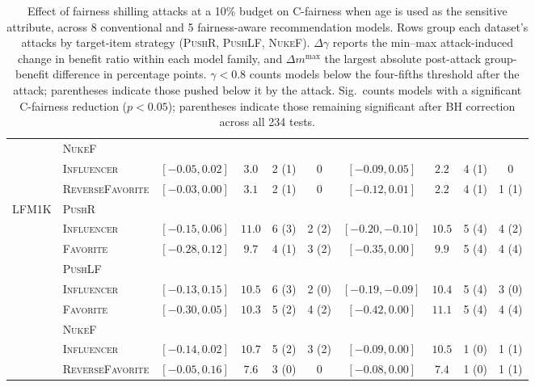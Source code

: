 \begin{table}
\begin{adjustbox}{max width=\textwidth}
\begin{tabular}{l l cccc cccc}
\cmidrule(lr){2-10}
 & \multicolumn{9}{l}{\textsc{NukeF}} \\
 & \quad \textsc{Influencer} & $[-0.05, 0.02]$ & $3.0$ & 2 (1) & 0 & $[-0.09, 0.05]$ & $2.2$ & 4 (1) & 0 \\
 & \quad \textsc{ReverseFavorite} & $[-0.03, 0.00]$ & $3.1$ & 2 (1) & 0 & $[-0.12, 0.01]$ & $2.2$ & 4 (1) & 1 (1) \\
\cmidrule(lr){1-10}
\multirow{9}{*}{LFM1K} & \multicolumn{9}{l}{\textsc{PushR}} \\
 & \quad \textsc{Influencer} & $[-0.15, 0.06]$ & $11.0$ & 6 (3) & 2 (2) & $[-0.20, -0.10]$ & $10.5$ & 5 (4) & 4 (2) \\
 & \quad \textsc{Favorite} & $[-0.28, 0.12]$ & $9.7$ & 4 (1) & 3 (2) & $[-0.35, 0.00]$ & $9.9$ & 5 (4) & 4 (4) \\
\addlinespace[2pt]
 & \multicolumn{9}{l}{\textsc{PushLF}} \\
 & \quad \textsc{Influencer} & $[-0.13, 0.15]$ & $10.5$ & 6 (3) & 2 (0) & $[-0.19, -0.09]$ & $10.4$ & 5 (4) & 3 (0) \\
 & \quad \textsc{Favorite} & $[-0.30, 0.05]$ & $10.3$ & 5 (2) & 4 (2) & $[-0.42, 0.00]$ & $11.1$ & 5 (4) & 4 (4) \\
\cmidrule(lr){2-10}
 & \multicolumn{9}{l}{\textsc{NukeF}} \\
 & \quad \textsc{Influencer} & $[-0.14, 0.02]$ & $10.7$ & 5 (2) & 3 (2) & $[-0.09, 0.00]$ & $10.5$ & 1 (0) & 1 (1) \\
 & \quad \textsc{ReverseFavorite} & $[-0.05, 0.16]$ & $7.6$ & 3 (0) & 0 & $[-0.08, 0.00]$ & $7.4$ & 1 (0) & 1 (1) \\
\bottomrule
\end{tabular}
\end{adjustbox}
\caption{Effect of fairness shilling attacks at a 10\% budget on C-fairness when age is used as the sensitive attribute, across 8 conventional and 5 fairness-aware recommendation models. Rows group each dataset's attacks by target-item strategy (\textsc{PushR}, \textsc{PushLF}, \textsc{NukeF}). $\Delta\gamma$ reports the min--max attack-induced change in benefit ratio within each model family, and $\Delta m^{\max}$ the largest absolute post-attack group-benefit difference in percentage points. $\gamma < 0.8$ counts models below the four-fifths threshold after the attack; parentheses indicate those pushed below it by the attack. Sig.\ counts models with a significant C-fairness reduction ($p < 0.05$); parentheses indicate those remaining significant after BH correction across all 234 tests.}
\label{tab:cfair_attacks_age_b10}
\end{table}
